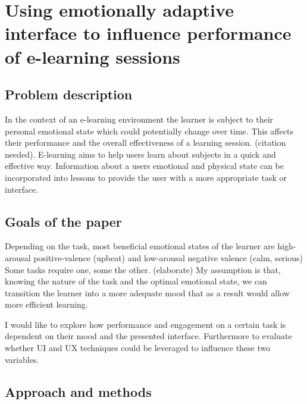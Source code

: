 

\pagebreak

\section {Using emotionally adaptive interface to influence performance of e-learning sessions}


\subsection{Problem description}

In the context of an e-learning environment the learner is subject to their personal emotional state which could potentially change over time. This affects their performance and the overall effectiveness of a learning session. (citation needed). E-learning aims to help users learn about subjects in a quick and effective way. Information about a users emotional and physical state can be incorporated into lessons to provide the user with a more appropriate task or interface.

\subsection{Goals of the paper}

Depending on the task, most beneficial emotional states of the learner are high-arousal positive-valence (upbeat) and low-arousal negative valence (calm, serious) \cite{NEEDED}
Some tasks require one, some the other. (elaborate)
My assumption is that, knowing the nature of the task and the optimal emotional state, we can transition the learner into a more adequate mood that as a result would allow more efficient learning.

I would like to explore how performance and engagement on a certain task is dependent on their mood and the presented interface.
Furthermore to evaluate whether UI and UX techniques could be leveraged to influence these two variables.


\subsection{Approach and methods}

